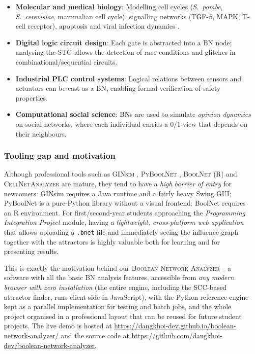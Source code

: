 \documentclass[oneside,final]{hcmut-report}
\begin{document}
\begin{itemize}[leftmargin=*]
    \item \textbf{Molecular and medical biology}: Modelling cell cycles (\textit{S.\ pombe}, \textit{S.\ cerevisiae}, mammalian cell cycle), signalling networks (TGF-$\beta$, MAPK, T-cell receptor), apoptosis and viral infection dynamics \cite{faure2006,davidich2008,schwab2020}.
    \item \textbf{Digital logic circuit design}: Each gate is abstracted into a BN node; analysing the STG allows the detection of race conditions and glitches in combinational/sequential circuits.
    \item \textbf{Industrial PLC control systems}: Logical relations between sensors and actuators can be cast as a BN, enabling formal verification of safety properties.
    \item \textbf{Computational social science}: BNs are used to simulate \textit{opinion dynamics} on social networks, where each individual carries a 0/1 view that depends on their neighbours.
\end{itemize}

\subsubsection{Tooling gap and motivation}
Although professional tools such as \textsc{GINsim} \cite{naldi2009}, \textsc{PyBoolNet} \cite{klarner2017pyboolnet}, \textsc{BoolNet} (R) and \textsc{CellNetAnalyzer} are mature, they tend to have a \textit{high barrier of entry} for newcomers: GINsim requires a Java runtime and a fairly heavy Swing GUI; PyBoolNet is a pure-Python library without a visual frontend; BoolNet requires an R environment. For first/second-year students approaching the \textit{Programming Integration Project} module, having a \textit{lightweight, cross-platform web application} that allows uploading a \texttt{.bnet} file and immediately seeing the influence graph together with the attractors is highly valuable both for learning and for presenting results.

This is exactly the motivation behind our \textsc{Boolean Network Analyzer} -- a software with all the basic BN analysis features, accessible from \textit{any modern browser with zero installation} (the entire engine, including the SCC-based attractor finder, runs client-side in JavaScript), with the Python reference engine kept as a parallel implementation for testing and batch jobs, and the whole project organised in a professional layout that can be reused for future student projects. The live demo is hosted at \url{https://dangkhoi-dev.github.io/boolean-network-analyzer/} and the source code at \url{https://github.com/dangkhoi-dev/boolean-network-analyzer}.
\end{document}
